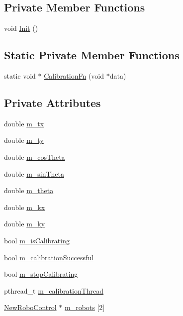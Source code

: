 \subsection*{Private Member Functions}
\begin{DoxyCompactItemize}
\item 
void \hyperlink{classCoordinatesCalibrer_a19faab9e443f7ef64462a36c19baf6bc}{Init} ()
\end{DoxyCompactItemize}
\subsection*{Static Private Member Functions}
\begin{DoxyCompactItemize}
\item 
static void $\ast$ \hyperlink{classCoordinatesCalibrer_a4ce4c153ae8c3e50faccfba40e6bc4ea}{CalibrationFn} (void $\ast$data)
\end{DoxyCompactItemize}
\subsection*{Private Attributes}
\begin{DoxyCompactItemize}
\item 
double \hyperlink{classCoordinatesCalibrer_ad3dcf12acb15253d8467440ccf917581}{m\_\-tx}
\item 
double \hyperlink{classCoordinatesCalibrer_a7e9c56017cf2f279564f2aba38aa146b}{m\_\-ty}
\item 
double \hyperlink{classCoordinatesCalibrer_a0fd71c87e90fc61802942e22c9584fb9}{m\_\-cosTheta}
\item 
double \hyperlink{classCoordinatesCalibrer_af2675b7f9f8612eb53e81a5268501180}{m\_\-sinTheta}
\item 
double \hyperlink{classCoordinatesCalibrer_a039975d1cf826afcb960e77f8f957f91}{m\_\-theta}
\item 
double \hyperlink{classCoordinatesCalibrer_a337af708f5dc1bfca0d191b988d8ab49}{m\_\-kx}
\item 
double \hyperlink{classCoordinatesCalibrer_a10648b2ef70a9ad0fd874e04f3b4d488}{m\_\-ky}
\item 
bool \hyperlink{classCoordinatesCalibrer_a2d3543afab02c87d0e06861d064bd265}{m\_\-isCalibrating}
\item 
bool \hyperlink{classCoordinatesCalibrer_aade3d6c933ebb71c197061828ca6b951}{m\_\-calibrationSuccessful}
\item 
bool \hyperlink{classCoordinatesCalibrer_ac8da80d736936d73e78f21a7f046855d}{m\_\-stopCalibrating}
\item 
pthread\_\-t \hyperlink{classCoordinatesCalibrer_aa2b792c4284dc94338c9acbd26ea2c3a}{m\_\-calibrationThread}
\item 
\hyperlink{classNewRoboControl}{NewRoboControl} $\ast$ \hyperlink{classCoordinatesCalibrer_aebcdb5e598d2af268ab93a0271c245b6}{m\_\-robots} \mbox{[}2\mbox{]}
\end{DoxyCompactItemize}


